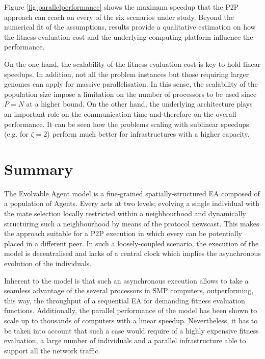 Figure \ref{fig:parallelperformance} shows the maximum speedup that the P2P approach can reach on every of the six scenarios under study. Beyond the numerical fit of the assumptions, results provide a qualitative estimation on how the fitness evaluation cost and the underlying computing platform influence the performance.

On the one hand, the scalability of the fitness evaluation cost is key to hold linear speedups. In addition, not all the problem instances but those requiring larger genomes can apply for massive parallelisation. In this sense, the scalability of the population size impose a limitation on the number of processors to be used since $P=N$ at a higher bound. On the other hand, the underlying architecture plays an important role on the communication time and therefore on the overall performance. It can be seen how the problems  scaling with sublinear speedups (e.g. for $\zeta=2$) perform much better for infrastructures with a higher capacity.

\clearpage
\section{Summary}


The Evolvable Agent model is a fine-grained spatially-structured EA composed of a population of Agents. Every \evag acts at two levels; evolving a single individual with the mate selection locally restricted within a neighbourhood and dynamically structuring such a neighbourhood by means of the protocol newscast.  This makes the approach suitable for a P2P execution in which every \evag can be potentially placed in a different peer. In such a loosely-coupled scenario, the execution of the model is decentralised and lacks of a central clock which implies the asynchronous evolution of the individuals.

Inherent to the model is that such an asynchronous execution allows to take a seamless advantage of the several processors in SMP computers, outperforming, this way, the throughput of a sequential EA for demanding fitness evaluation functions. Additionally, the parallel performance of the model has been shown to scale up to thousands of computers with a linear speedup. Nevertheless, it has to be taken into account that such a case would require of a highly expensive fitness evaluation, a large number of individuals and a parallel infrastructure able to support all the network traffic.


